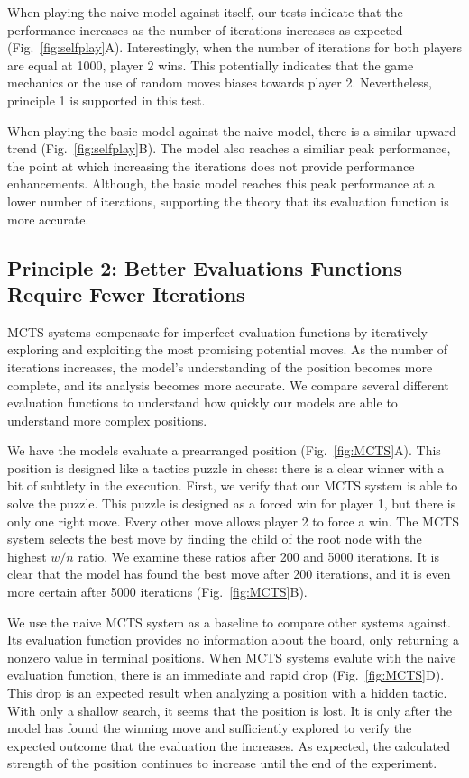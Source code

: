 \documentclass[10pt]{article}
\begin{document}
When playing the naive model against itself, our tests indicate that the performance increases as the number of iterations increases as expected (Fig.~\ref{fig:selfplay}A). Interestingly, when the number of iterations for both players are equal at 1000, player 2 wins. This potentially indicates that the game mechanics or the use of random moves biases towards player 2. Nevertheless, principle 1 is supported in this test.

When playing the basic model against the naive model, there is a similar upward trend (Fig.~\ref{fig:selfplay}B). The model also reaches a similiar peak performance, the point at which increasing the iterations does not provide performance enhancements. Although, the basic model reaches this peak performance at a lower number of iterations, supporting the theory that its evaluation function is more accurate. 

\subsection{Principle 2: Better Evaluations Functions Require Fewer Iterations}

MCTS systems compensate for imperfect evaluation functions by iteratively exploring and exploiting the most promising potential moves. As the number of iterations increases, the model's understanding of the position becomes more complete, and its analysis becomes more accurate. We compare several different evaluation functions to understand how quickly our models are able to understand more complex positions.

We have the models evaluate a prearranged position (Fig.~\ref{fig:MCTS}A). This position is designed like a tactics puzzle in chess: there is a clear winner with a bit of subtlety in the execution. First, we verify that our MCTS system is able to solve the puzzle. This puzzle is designed as a forced win for player 1, but there is only one right move. Every other move allows player 2 to force a win. The MCTS system selects the best move by finding the child of the root node with the highest $w / n$ ratio. We examine these ratios after 200 and 5000 iterations. It is clear that the model has found the best move after 200 iterations, and it is even more certain after 5000 iterations (Fig.~\ref{fig:MCTS}B).

We use the naive MCTS system as a baseline to compare other systems against. Its evaluation function provides no information about the board, only returning a nonzero value in terminal positions. When MCTS systems evalute with the naive evaluation function, there is an immediate and rapid drop (Fig.~\ref{fig:MCTS}D). This drop is an expected result when analyzing a position with a hidden tactic. With only a shallow search, it seems that the position is lost. It is only after the model has found the winning move and sufficiently explored to verify the expected outcome that the evaluation the increases. As expected, the calculated strength of the position continues to increase until the end of the experiment.
\end{document}
